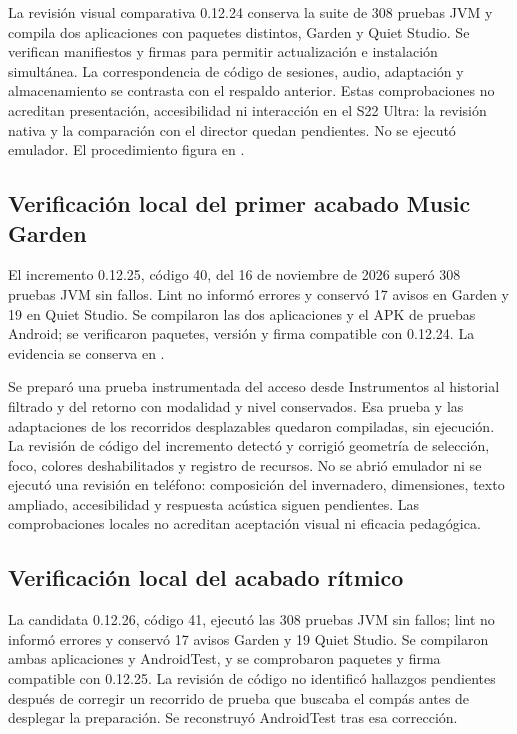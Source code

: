 La revisión visual comparativa 0.12.24 conserva la suite de 308 pruebas JVM y
compila dos aplicaciones con paquetes distintos, Garden y Quiet Studio.
Se verifican manifiestos y firmas para permitir actualización e instalación
simultánea. La correspondencia de código de sesiones, audio, adaptación y
almacenamiento se contrasta con el respaldo anterior. Estas comprobaciones no
acreditan presentación, accesibilidad ni interacción en el S22 Ultra: la
revisión nativa y la comparación con el director quedan pendientes. No se
ejecutó emulador. El procedimiento figura en
.

\subsection{Verificación local del primer acabado Music Garden}
El incremento 0.12.25, código 40, del 16 de noviembre de 2026 superó 308
pruebas JVM sin fallos. Lint no informó errores y conservó 17 avisos en Garden
y 19 en Quiet Studio. Se compilaron las dos aplicaciones y el APK de pruebas
Android; se verificaron paquetes, versión y firma compatible con 0.12.24.
La evidencia se conserva en .

Se preparó una prueba instrumentada del acceso desde Instrumentos al historial
filtrado y del retorno con modalidad y nivel conservados. Esa prueba y las
adaptaciones de los recorridos desplazables quedaron compiladas, sin ejecución.
La revisión de código del incremento detectó y corrigió geometría de selección,
foco, colores deshabilitados y registro de recursos. No se abrió emulador ni
se ejecutó una revisión en teléfono: composición del invernadero, dimensiones,
texto ampliado, accesibilidad y respuesta acústica siguen pendientes. Las
comprobaciones locales no acreditan aceptación visual ni eficacia pedagógica.

\subsection{Verificación local del acabado rítmico}
La candidata 0.12.26, código 41, ejecutó las 308 pruebas JVM sin fallos; lint
no informó errores y conservó 17 avisos Garden y 19 Quiet Studio. Se compilaron
ambas aplicaciones y AndroidTest, y se comprobaron paquetes y firma compatible
con 0.12.25. La revisión de código no identificó hallazgos pendientes después
de corregir un recorrido de prueba que buscaba el compás antes de desplegar
la preparación. Se reconstruyó AndroidTest tras esa corrección.

